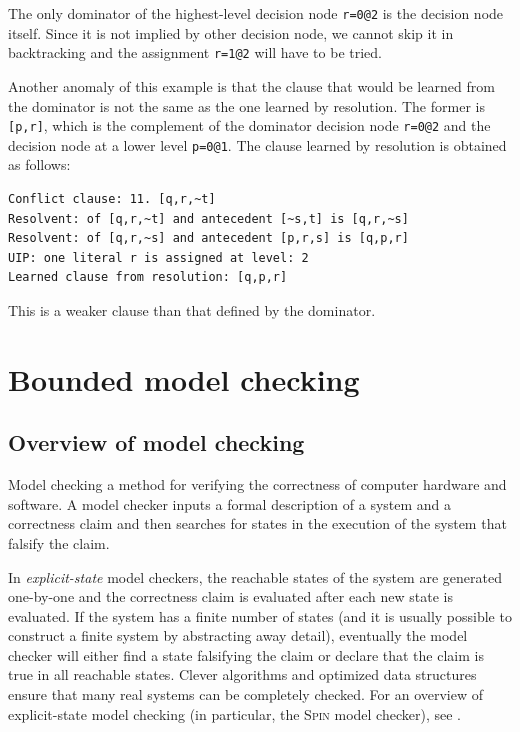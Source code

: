 \documentclass[11pt]{report}
\begin{document}
The only dominator of the highest-level decision node \verb+r=0@2+ is
the decision node itself. Since it is not implied by other decision
node, we cannot skip it in backtracking and the assignment \verb+r=1@2+
will have to be tried.

Another anomaly of this example is that the clause that would be learned
from the dominator is not the same as the one learned by resolution. The
former is \verb+[p,r]+, which is the complement of the dominator
decision node \verb+r=0@2+ and the decision node at a lower level
\verb+p=0@1+. The clause learned by resolution is obtained as follows:

\begin{verbatim}
Conflict clause: 11. [q,r,~t]
Resolvent: of [q,r,~t] and antecedent [~s,t] is [q,r,~s]
Resolvent: of [q,r,~s] and antecedent [p,r,s] is [q,p,r]
UIP: one literal r is assigned at level: 2
Learned clause from resolution: [q,p,r]
\end{verbatim}

This is a weaker clause than that defined by the dominator.

\chapter{Bounded model checking}\label{ch.model}

\section{Overview of model checking}

Model checking a method for verifying the correctness of computer
hardware and software. A model checker inputs a formal description of a
system and a correctness claim and then searches for states in the
execution of the system that falsify the claim.

In \emph{explicit-state} model checkers, the reachable states of the
system are generated one-by-one and the correctness claim is evaluated
after each new state is evaluated. If the system has a finite number of
states (and it is usually possible to construct a finite system by
abstracting away detail), eventually the model checker will either find
a state falsifying the claim or declare that the claim is true in all
reachable states. Clever algorithms and optimized data structures ensure
that many real systems can be completely checked. For an overview of
explicit-state model checking (in particular, the \textsc{Spin} model
checker), see \cite{primer}.
\end{document}
